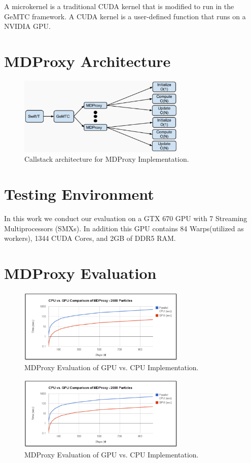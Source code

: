 \documentclass[conference]{IEEEtran}
\begin{document}
A microkernel is a traditional CUDA kernel that is modiﬁed to run in the GeMTC framework. A CUDA kernel is a user-deﬁned function that runs on a NVIDIA GPU.

\section{MDProxy Architecture}
\begin{figure}[h]
\centering\includegraphics[width=8cm]{imgs/md_proxy_arch.png}
\caption{Callstack architecture for MDProxy Implementation.}
\label{fig:md_proxy_arch}
\end{figure}


\section{Testing Environment}
In this work we conduct our evaluation on a GTX 670 GPU with 7 Streaming Multiprocessors (SMXs). In addition this GPU contains 84 Warps(utilized as workers), 1344 CUDA Cores, and 2GB of DDR5 RAM.

\section{MDProxy Evaluation}
\begin{figure}[h]
\centering\includegraphics[width=8cm]{imgs/cpu_gpu.png}
\caption{MDProxy Evaluation of GPU vs. CPU Implementation.}
\label{fig:cpu_gpu}
\end{figure}

\begin{figure}[h]
\centering\includegraphics[width=8cm]{imgs/cpu_gpu.png}
\caption{MDProxy Evaluation of GPU vs. CPU Implementation.}
\label{fig:cpu_gpu}
\end{figure}
\end{document}
